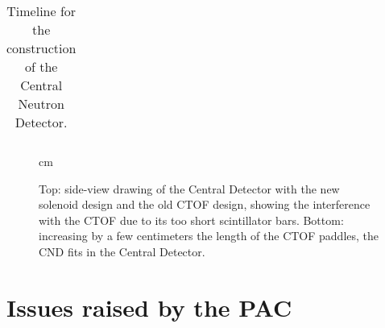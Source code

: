 \documentclass[12pt,oneside]{article}
\begin{document}
{\begin{table}
\begin{center}
\begin{tabular}{|c|c|}
\end{tabular}
\caption{Timeline for the construction of the Central Neutron Detector.}
\label{table_plan}
\end{center}

\end{table}

\begin{figure}[h]  
\begin{center}
 cm
\caption{Top: side-view drawing of the Central Detector with the new solenoid design and the old CTOF design, showing the interference with the CTOF due to its too short scintillator bars. Bottom: increasing by a few centimeters the length of the CTOF paddles, the CND fits in the Central Detector.}
\label{ctof_interference}
\end{center}
\end{figure}

\section{Issues raised by the PAC}
}
\end{document}
